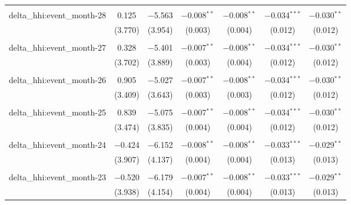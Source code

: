 \begin{table}[H]
{\begin{tabular}{@{\extracolsep{5pt}}lcccccc}
   & & & & & & \\  

  delta\_hhi:event\_month-28 & 0.125 & $-$5.563 & $-$0.008$^{**}$ & $-$0.008$^{**}$ & $-$0.034$^{***}$ & $-$0.030$^{**}$ \\  

   & (3.770) & (3.954) & (0.003) & (0.004) & (0.012) & (0.012) \\  

   & & & & & & \\  

  delta\_hhi:event\_month-27 & 0.328 & $-$5.401 & $-$0.007$^{**}$ & $-$0.008$^{**}$ & $-$0.034$^{***}$ & $-$0.030$^{**}$ \\  

   & (3.702) & (3.889) & (0.003) & (0.004) & (0.012) & (0.012) \\  

   & & & & & & \\  

  delta\_hhi:event\_month-26 & 0.905 & $-$5.027 & $-$0.007$^{**}$ & $-$0.008$^{**}$ & $-$0.034$^{***}$ & $-$0.030$^{**}$ \\  

   & (3.409) & (3.643) & (0.003) & (0.003) & (0.012) & (0.012) \\  

   & & & & & & \\  

  delta\_hhi:event\_month-25 & 0.839 & $-$5.075 & $-$0.007$^{**}$ & $-$0.008$^{**}$ & $-$0.034$^{***}$ & $-$0.030$^{**}$ \\  

   & (3.474) & (3.835) & (0.004) & (0.004) & (0.012) & (0.012) \\  

   & & & & & & \\  

  delta\_hhi:event\_month-24 & $-$0.424 & $-$6.152 & $-$0.008$^{**}$ & $-$0.008$^{**}$ & $-$0.033$^{***}$ & $-$0.029$^{**}$ \\  

   & (3.907) & (4.137) & (0.004) & (0.004) & (0.013) & (0.013) \\  

   & & & & & & \\  

  delta\_hhi:event\_month-23 & $-$0.520 & $-$6.179 & $-$0.007$^{**}$ & $-$0.008$^{**}$ & $-$0.033$^{***}$ & $-$0.029$^{**}$ \\  

   & (3.938) & (4.154) & (0.004) & (0.004) & (0.013) & (0.013) \\  


\end{tabular}}
\end{table}
